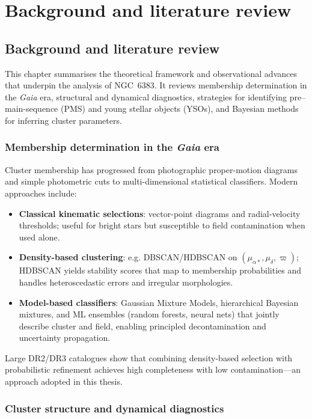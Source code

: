 \documentclass[../main.tex]{subfiles}
\begin{document}
\section{Background and literature review}
\label{sec:background-overview}

\subsection{Background and literature review}
\label{subsec:background}

This chapter summarises the theoretical framework and observational advances that underpin the analysis of NGC~6383. It reviews membership determination in the \texorpdfstring{\textit{Gaia}}{Gaia} era, structural and dynamical diagnostics, strategies for identifying pre–main-sequence (PMS) and young stellar objects (YSOs), and Bayesian methods for inferring cluster parameters.

\subsubsection{Membership determination in the \texorpdfstring{\textit{Gaia}}{Gaia} era}
\label{subsubsec:membership-gaia}

Cluster membership has progressed from photographic proper-motion diagrams and simple photometric cuts to multi-dimensional statistical classifiers. Modern approaches include:
\begin{itemize}
  \item \textbf{Classical kinematic selections}: vector-point diagrams and radial-velocity thresholds; useful for bright stars but susceptible to field contamination when used alone.
  \item \textbf{Density-based clustering}: e.g. DBSCAN/HDBSCAN on $(\mu_{\alpha*},\mu_\delta,\varpi)$; HDBSCAN yields stability scores that map to membership probabilities and handles heteroscedastic errors and irregular morphologies.
  \item \textbf{Model-based classifiers}: Gaussian Mixture Models, hierarchical Bayesian mixtures, and ML ensembles (random forests, neural nets) that jointly describe cluster and field, enabling principled decontamination and uncertainty propagation.
\end{itemize}
Large DR2/DR3 catalogues show that combining density-based selection with probabilistic refinement achieves high completeness with low contamination—an approach adopted in this thesis.

\subsubsection{Cluster structure and dynamical diagnostics}
\label{subsubsec:structure-dynamics}
\end{document}
